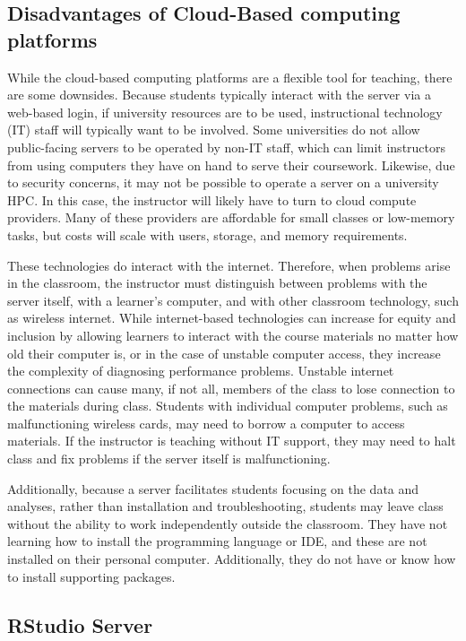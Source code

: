 \subsection{Disadvantages of Cloud-Based computing platforms}\label{subsub:cloud-disdvantage}

While the cloud-based computing platforms are a flexible tool for teaching, there are some downsides.
Because students typically interact with the server via a web-based login, if university resources are to be used, 
instructional technology (IT) staff will typically want to be involved.
Some universities do not allow public-facing servers to be operated by non-IT staff, which can 
limit instructors from using computers they have on hand to serve their coursework.
Likewise, due to security concerns, it may not be possible to operate a server on a university HPC.
In this case, the instructor will likely have to turn to cloud compute providers.
Many of these providers are affordable for small classes or low-memory tasks, but costs will scale with users, storage, and memory requirements.

These technologies do interact with the internet.
Therefore, when problems arise in the classroom, the instructor must distinguish between problems with the server itself, with a 
learner's computer, and with other classroom technology, such as wireless internet.
While internet-based technologies can increase for equity and inclusion by allowing learners to 
interact with the course materials no matter how old their computer is, or in the case of  unstable computer access, 
they increase the complexity of diagnosing performance problems.
Unstable internet connections can cause many, if not all, members of the class to lose connection to the materials during class.
Students with individual computer problems, such as malfunctioning wireless cards, may need to borrow a computer to access materials. 
If the instructor is teaching without IT support, they may need to halt class and fix problems if the server itself is malfunctioning.

Additionally, because a server facilitates students focusing on the data
and analyses, rather than installation and troubleshooting, students may leave
class without the ability to work independently outside the classroom.
They have not learning how to install the programming language or IDE, and these 
are not installed on their personal computer.
Additionally, they do not have or know how to install supporting packages.


\subsection{RStudio Server}\label{subsub:RStudio}

